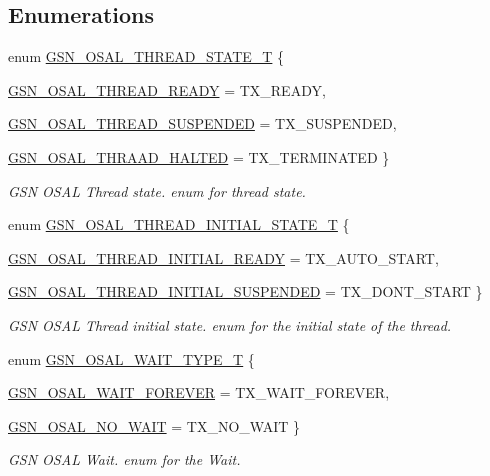 \subsection*{Enumerations}
\begin{DoxyCompactItemize}
\item 
enum \hyperlink{a00628_gae961839651f7d7d0065cca8c4efb88f6}{GSN\_\-OSAL\_\-THREAD\_\-STATE\_\-T} \{ \par
\hyperlink{a00628_ggae961839651f7d7d0065cca8c4efb88f6a8c5e43061dfdf8e939c3feaf584c4756}{GSN\_\-OSAL\_\-THREAD\_\-READY} =  TX\_\-READY, 
\par
\hyperlink{a00628_ggae961839651f7d7d0065cca8c4efb88f6af4b7e2cc66788d5d82aa0f4e97e32573}{GSN\_\-OSAL\_\-THREAD\_\-SUSPENDED} =  TX\_\-SUSPENDED, 
\par
\hyperlink{a00628_ggae961839651f7d7d0065cca8c4efb88f6a8ee2a33c7fe97d7512e9c2c6e3e117ac}{GSN\_\-OSAL\_\-THRAAD\_\-HALTED} =  TX\_\-TERMINATED
 \}
\begin{DoxyCompactList}\small\item\em GSN OSAL Thread state. enum for thread state. \end{DoxyCompactList}\item 
enum \hyperlink{a00628_ga0aaa82e357c4ce95100dc1df18ec3363}{GSN\_\-OSAL\_\-THREAD\_\-INITIAL\_\-STATE\_\-T} \{ \par
\hyperlink{a00628_gga0aaa82e357c4ce95100dc1df18ec3363ad09f63f7f5222fec1fffa19c96e195fd}{GSN\_\-OSAL\_\-THREAD\_\-INITIAL\_\-READY} =  TX\_\-AUTO\_\-START, 
\par
\hyperlink{a00628_gga0aaa82e357c4ce95100dc1df18ec3363a8c847980c5d8cf9772ddb4951ebf58f1}{GSN\_\-OSAL\_\-THREAD\_\-INITIAL\_\-SUSPENDED} =  TX\_\-DONT\_\-START
 \}
\begin{DoxyCompactList}\small\item\em GSN OSAL Thread initial state. enum for the initial state of the thread. \end{DoxyCompactList}\item 
enum \hyperlink{a00628_ga5568febc25b2751efc49a3eddcee65f5}{GSN\_\-OSAL\_\-WAIT\_\-TYPE\_\-T} \{ \par
\hyperlink{a00628_gga5568febc25b2751efc49a3eddcee65f5ab182840f9fc7dc34a9b3156a929d9a2f}{GSN\_\-OSAL\_\-WAIT\_\-FOREVER} =  TX\_\-WAIT\_\-FOREVER, 
\par
\hyperlink{a00628_gga5568febc25b2751efc49a3eddcee65f5a406a6391540b62f9dde0aa96311bfb00}{GSN\_\-OSAL\_\-NO\_\-WAIT} =  TX\_\-NO\_\-WAIT
 \}
\begin{DoxyCompactList}\small\item\em GSN OSAL Wait. enum for the Wait. \end{DoxyCompactList}\item 

\end{DoxyCompactItemize}
